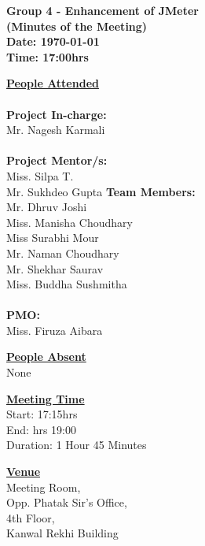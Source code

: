 \documentclass[a4paper,12pt]{article}
\begin{document}
\LARGE
\begin{center}
\textbf
{
Group 4 - Enhancement of JMeter\\
(Minutes of the Meeting) \\ 
Date: \today \\
Time: 17:00hrs
}
\end{center}

\vfill

\large

\underline{\textbf{People Attended}} \\ 
\\
\indent \textbf{Project In-charge:} \\
\indent Mr. Nagesh Karmali \\
\\
\indent \textbf{Project Mentor/s:} \\
\indent Miss. Silpa T. \\
\indent Mr. Sukhdeo Gupta
\vfill
\indent \textbf{Team Members:} \\
\indent Mr. Dhruv Joshi \\
\indent Miss. Manisha Choudhary \\
\indent Miss Surabhi Mour \\
\indent Mr. Naman Choudhary \\
\indent Mr. Shekhar Saurav \\
\indent Miss. Buddha Sushmitha \\
\\
\indent \textbf{PMO:} \\
\indent Miss. Firuza Aibara\\

\vfill

\underline{\textbf{People Absent}} \\ 
\indent None
\vfill

\underline{\textbf{Meeting Time}} \\
\indent Start: 17:15hrs \\
\indent End: hrs 19:00\\
\indent Duration: 1 Hour 45 Minutes \\

\vfill

\underline{\textbf{Venue}} \\
\indent Meeting Room, \\ 
\indent Opp. Phatak Sir's Office,\\ 
\indent 4th Floor, \\
\indent Kanwal Rekhi Building
\end{document}
